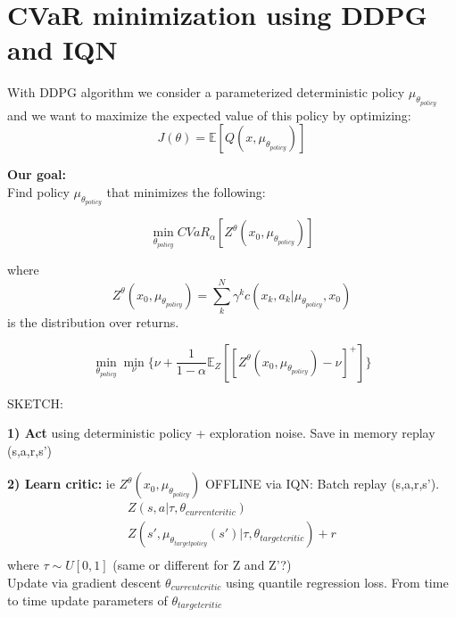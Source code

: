 
\section{CVaR minimization using DDPG and IQN}

With DDPG algorithm we consider a parameterized deterministic policy $\mu_{\theta_{policy}}$ 
and we want to maximize the expected value of this policy by optimizing:
\begin{equation}
    J(\theta)= \mathbb E[Q(x,\mu_{\theta_{policy}})]
\end{equation}

\textbf{Our goal:} \\
Find policy $\mu_{\theta_{policy}}$ that minimizes the following:

\begin{equation}
    \underset{\theta_{policy}} \min CVaR_\alpha [Z^\theta (x_0,\mu_{\theta_{policy}})]
\end{equation}

where 
\begin{equation}
    Z^\theta (x_0,\mu_{\theta_{policy}}) = \sum_k^N \gamma^k c(x_k,a_k | \mu_{\theta_{policy}}, x_0)
\end{equation}
is the distribution over returns.


\begin{equation}
    \underset{\theta_{policy}} \min  \underset{\nu} \min \big\{\nu + \frac{1}{1-\alpha} \mathbb E_Z[[Z^\theta (x_0,\mu_{\theta_{policy}})- \nu]^+]\big\}
\end{equation}

\vspace{0.5cm}
SKETCH:

\textbf{1) Act} using deterministic policy + exploration noise. Save in memory replay (s,a,r,s')\newline

\textbf{2) Learn critic:} ie $Z^\theta (x_0,\mu_{\theta_{policy}})$ OFFLINE via IQN: \newline
Batch replay (s,a,r,s').
\begin{eqnarray}
    Z(s,a | \tau, \theta_{currentcritic})  \\
    Z(s',\mu_{\theta_{targetpolicy}}(s') | \tau, \theta_{targetcritic}) + r  \\
\end{eqnarray}
where $\tau  \sim U[0,1]$ (same or different for Z and Z'?)\\
        
Update via gradient descent $\theta_{currentcritic}$ using quantile regression loss.
From time to time update parameters of $\theta_{targetcritic}$ \newpage

